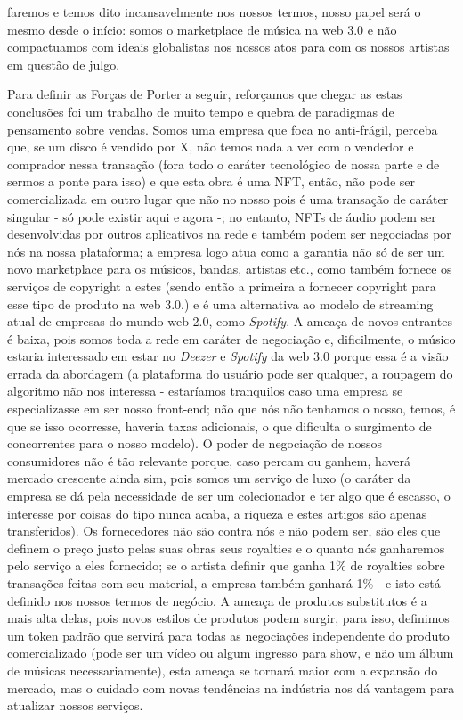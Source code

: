 \documentclass[onecolumn,12pt]{asme2ej}
\begin{document}
faremos e temos dito incansavelmente nos nossos termos, nosso papel será o mesmo desde o início: somos o marketplace de música na web 3.0 e não compactuamos com ideais globalistas nos nossos atos para com os nossos artistas em questão de julgo.

Para definir as Forças de Porter a seguir, reforçamos que chegar as estas conclusões foi um trabalho de muito tempo e quebra de paradigmas de pensamento sobre vendas. Somos uma empresa que foca no anti-frágil, perceba que, se um disco é vendido por X, não temos nada a ver com o vendedor e comprador nessa transação (fora todo o caráter tecnológico de nossa parte e de sermos a ponte para isso) e que esta obra é uma NFT, então, não pode ser comercializada em outro lugar que não no nosso pois é uma transação de caráter singular - só pode existir aqui e agora -; no entanto, NFTs de áudio podem ser desenvolvidas por outros aplicativos na rede e também podem ser negociadas por nós na nossa plataforma; a empresa logo atua como a garantia não só de ser um novo marketplace para os músicos, bandas, artistas etc., como também fornece os serviços de copyright a estes (sendo então a primeira a fornecer copyright para esse tipo de produto na web 3.0.) e é uma alternativa ao modelo de streaming atual de empresas do mundo web 2.0, como {\it Spotify}. A ameaça de novos entrantes é baixa, pois somos toda a rede em caráter de negociação e, dificilmente, o músico estaria interessado em estar no {\it Deezer} e {\it Spotify} da web 3.0 porque essa é a visão errada da abordagem (a plataforma do usuário pode ser qualquer, a roupagem do algoritmo não nos interessa - estaríamos tranquilos caso uma empresa se especializasse em ser nosso front-end; não que nós não tenhamos o nosso, temos, é que se isso ocorresse, haveria taxas adicionais, o que dificulta o surgimento de concorrentes para o nosso modelo). O poder de negociação de nossos consumidores não é tão relevante porque, caso percam ou ganhem, haverá mercado crescente ainda sim, pois somos um serviço de luxo (o caráter da empresa se dá pela necessidade de ser um colecionador e ter algo que é escasso, o interesse por coisas do tipo nunca acaba, a riqueza e estes artigos são apenas transferidos). Os fornecedores não são contra nós e não podem ser, são eles que definem o preço justo pelas suas obras seus royalties e o quanto nós ganharemos pelo serviço a eles fornecido; se o artista definir que ganha 1\% de royalties sobre transações feitas com seu material, a empresa também ganhará 1\% - e isto está definido nos nossos termos de negócio. A ameaça de produtos substitutos é a mais alta delas, pois novos estilos de produtos podem surgir, para isso, definimos um token padrão que servirá para todas as negociações independente do produto comercializado (pode ser um vídeo ou algum ingresso para show, e não um álbum de músicas necessariamente), esta ameaça se tornará maior com a expansão do mercado, mas o cuidado com novas tendências na indústria nos dá vantagem para atualizar nossos serviços.
\end{document}
